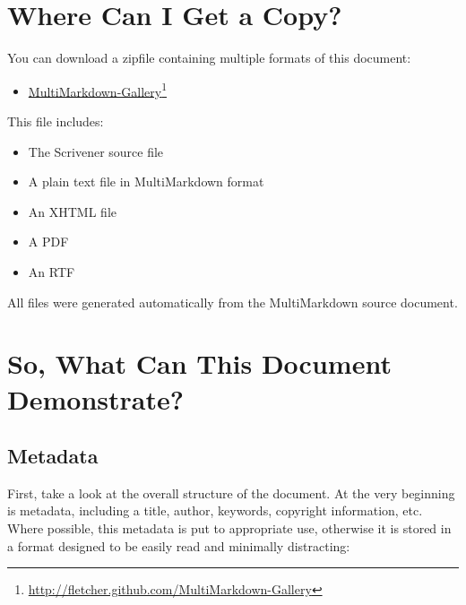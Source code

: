 \chapter{Where Can I Get a Copy?}
\label{wherecanigetacopy}

You can download a zipfile containing multiple formats of this document:

\begin{itemize}
\item \href{http://fletcher.github.com/MultiMarkdown-Gallery}{MultiMarkdown-Gallery}\footnote{\href{http://fletcher.github.com/MultiMarkdown-Gallery}{http:\slash \slash fletcher.github.com\slash MultiMarkdown-Gallery}}

\end{itemize}

This file includes:

\begin{itemize}
\item The Scrivener source file

\item A plain text file in MultiMarkdown format

\item An XHTML file

\item A PDF

\item An RTF

\end{itemize}

All files were generated automatically from the MultiMarkdown source document.

\chapter{So, What Can This Document Demonstrate?}
\label{sowhatcanthisdocumentdemonstrate}

\section{Metadata}
\label{metadata}

First, take a look at the overall structure of the document. At the very
beginning is metadata, including a title, author, keywords, copyright
information, etc. Where possible, this metadata is put to appropriate use,
otherwise it is stored in a format designed to be easily read and minimally
distracting:

